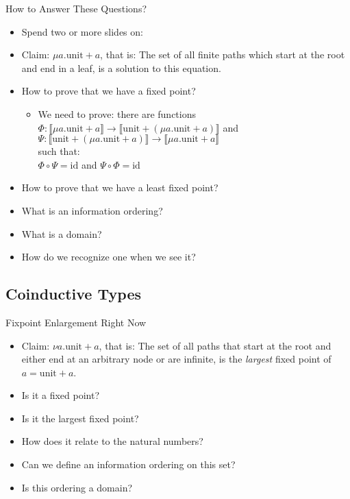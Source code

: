 \documentclass{beamer}
\newcommand{\arr}{\rightarrow}
\begin{document}
\begin{frame}{How to Answer These Questions?}

  \begin{itemize}
    \item Spend two or more slides on:
    \item Claim: $\mu a . \text{unit} + a$, that is: The set of all finite paths which
          start at the root and end in a leaf, is a solution to this equation.
    \item How to prove that we have a fixed point?
    \begin{itemize}
      \item We need to prove: there are functions
            $\Phi : \llbracket \mu a . \text{unit} + a \rrbracket \arr \llbracket \text{unit} + (\mu a . \text{unit} + a) \rrbracket$
            and
            $\Psi : \llbracket \text{unit} + (\mu a . \text{unit} + a) \rrbracket \arr \llbracket \mu a . \text{unit} + a \rrbracket$ \\
            such that: \\
            $\Phi \circ \Psi = \text{id}$ and $\Psi \circ \Phi = \text{id}$
    \end{itemize}
    \item How to prove that we have a least fixed point?
    \item What is an information ordering?
    \item What is a domain?
    \item How do we recognize one when we see it?
  \end{itemize}

\end{frame}


\subsection{Coinductive Types}

\begin{frame}{Fixpoint Enlargement Right Now}

  \begin{itemize}
    \item Claim: $\nu a . \text{unit} + a$, that is: The set of all paths that start
          at the root and either end at an arbitrary node or are infinite, is
          the \emph{largest} fixed point of $a = \text{unit} + a$.
    \item Is it a fixed point?
    \item Is it the largest fixed point?
    \item How does it relate to the natural numbers?
    \item Can we define an information ordering on this set?
    \item Is this ordering a domain?
  \end{itemize}

\end{frame}
\end{document}
